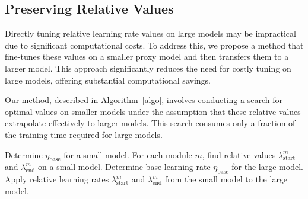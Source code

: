 \documentclass{article}
\theoremstyle{plain}
\theoremstyle{definition}
\theoremstyle{remark}
\begin{document}
    
    
    
    
    
    
    
    
    
    \subsection{Preserving Relative Values}
    
    
    Directly tuning relative learning rate values on large models may be impractical due to significant computational costs. To address this, we propose a method that fine-tunes these values on a smaller proxy model and then transfers them to a larger model. This approach significantly reduces the need for costly tuning on large models, offering substantial computational savings.
    
    Our method, described in Algorithm~\ref{algo}, involves conducting a search for optimal values on smaller models under the assumption that these relative values extrapolate effectively to larger models. This search consumes only a fraction of the training time required for large models.
    
    \begin{algorithm*}
    \caption{Relative Learning Rate Adjustment Procedure}
    \begin{algorithmic}[1]
    \State Determine $\eta_{\text{base}}$ for a small model.
    \State For each module $m$, find relative values $\lambda_{\text{start}}^m$ and $\lambda_{\text{end}}^m$ on a small model.
    \State Determine base learning rate $\eta_{\text{base}}$ for the large model.
    \State Apply relative learning rates $\lambda_{\text{start}}^m$ and $\lambda_{\text{end}}^m$ from the small model to the large model.
    \end{algorithmic}
    \label{algo}
    \end{algorithm*}
    
\end{document}
